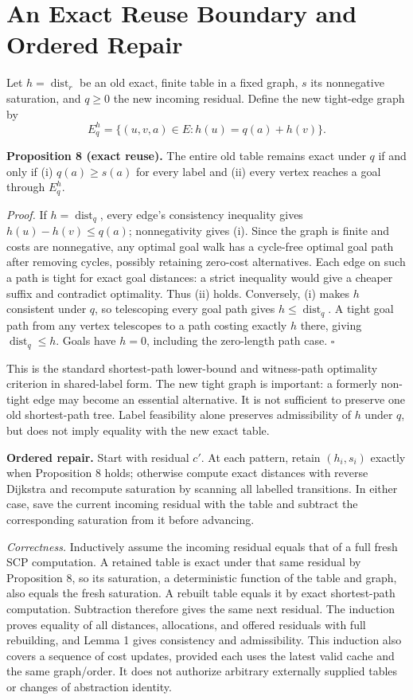 \section{An Exact Reuse Boundary and Ordered Repair}
Let $h=\operatorname{dist}_r$ be an old exact, finite table in a fixed graph, $s$ its nonnegative saturation, and $q\geq0$ the new incoming residual. Define the new tight-edge graph by
\[
 E_q^h=\{(u,v,a)\in E:h(u)=q(a)+h(v)\}.
\]

\textbf{Proposition 8 (exact reuse).} The entire old table remains exact under $q$ if and only if (i) $q(a)\geq s(a)$ for every label and (ii) every vertex reaches a goal through $E_q^h$.

\textit{Proof.} If $h=\operatorname{dist}_q$, every edge's consistency inequality gives $h(u)-h(v)\leq q(a)$; nonnegativity gives (i). Since the graph is finite and costs are nonnegative, any optimal goal walk has a cycle-free optimal goal path after removing cycles, possibly retaining zero-cost alternatives. Each edge on such a path is tight for exact goal distances: a strict inequality would give a cheaper suffix and contradict optimality. Thus (ii) holds. Conversely, (i) makes $h$ consistent under $q$, so telescoping every goal path gives $h\leq\operatorname{dist}_q$. A tight goal path from any vertex telescopes to a path costing exactly $h$ there, giving $\operatorname{dist}_q\leq h$. Goals have $h=0$, including the zero-length path case. $\square$

This is the standard shortest-path lower-bound and witness-path optimality criterion in shared-label form. The new tight graph is important: a formerly non-tight edge may become an essential alternative. It is not sufficient to preserve one old shortest-path tree. Label feasibility alone preserves admissibility of $h$ under $q$, but does not imply equality with the new exact table.

\textbf{Ordered repair.} Start with residual $c'$. At each pattern, retain $(h_i,s_i)$ exactly when Proposition 8 holds; otherwise compute exact distances with reverse Dijkstra and recompute saturation by scanning all labelled transitions. In either case, save the current incoming residual with the table and subtract the corresponding saturation from it before advancing.

\textit{Correctness.} Inductively assume the incoming residual equals that of a full fresh SCP computation. A retained table is exact under that same residual by Proposition 8, so its saturation, a deterministic function of the table and graph, also equals the fresh saturation. A rebuilt table equals it by exact shortest-path computation. Subtraction therefore gives the same next residual. The induction proves equality of all distances, allocations, and offered residuals with full rebuilding, and Lemma 1 gives consistency and admissibility. This induction also covers a sequence of cost updates, provided each uses the latest valid cache and the same graph/order. It does not authorize arbitrary externally supplied tables or changes of abstraction identity.

